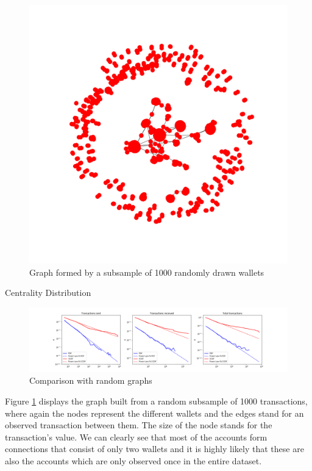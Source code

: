 \begin{figure}[!ht]
\centering
\includegraphics[scale=0.475]{../analysis/graph-subsample-1000.png}
\caption{Graph formed by a subsample of 1000 randomly drawn wallets}
\label{graphgraph}
\end{figure}

\begin{table}[!ht]
\centering
\caption{Centrality Distribution}

\label{graphtable}
\end{table}

\begin{figure}[!ht]
\centering
\includegraphics[width=\textwidth]{../analysis/power-law-fit.png}
\caption{Comparison with random graphs}
\label{powerlaw}
\end{figure}


Figure \ref{graphgraph} displays the graph built from a random subsample of 1000 transactions, where again the nodes represent the different wallets and the edges stand for an observed transaction between them. 
The size of the node stands for the transaction's value. We can clearly see that most of the accounts form connections that consist of only two wallets and it is highly likely that these are also the accounts which are only observed once in the entire dataset. 

